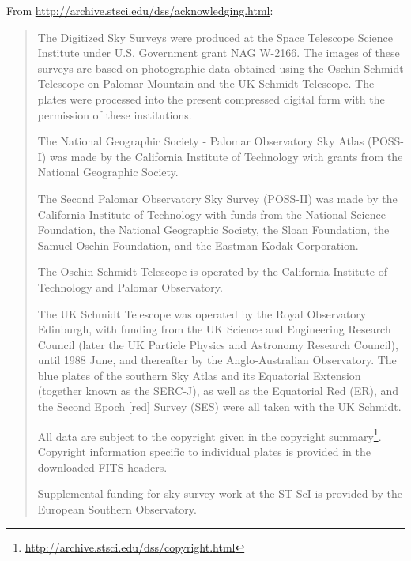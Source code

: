 From \url{http://archive.stsci.edu/dss/acknowledging.html}: %
\begin{quotation}
\noindent The Digitized Sky Surveys were produced at the Space Telescope Science Institute under U.S. Government grant NAG W-2166. 
The images of these surveys are based on photographic data obtained using the Oschin Schmidt Telescope on Palomar Mountain and the UK Schmidt Telescope. 
The plates were processed into the present compressed digital form with the permission of these institutions.

The National Geographic Society - Palomar Observatory Sky Atlas (POSS-I) was made by the 
California Institute of Technology with grants from the National Geographic Society.

The Second Palomar Observatory Sky Survey (POSS-II) was made by the California Institute of Technology with 
funds from the National Science Foundation, the National Geographic Society, the Sloan Foundation, 
the Samuel Oschin Foundation, and the Eastman Kodak Corporation.

The Oschin Schmidt Telescope is operated by the California Institute of Technology and Palomar Observatory.

The UK Schmidt Telescope was operated by the Royal Observatory Edinburgh, with funding from the 
UK Science and Engineering Research Council (later the UK Particle Physics and Astronomy Research Council), 
until 1988 June, and thereafter by the Anglo-Australian Observatory. 
The blue plates of the southern Sky Atlas and its Equatorial Extension (together known as the SERC-J), 
as well as the Equatorial Red (ER), and the Second Epoch [red] Survey (SES) were all taken with the UK Schmidt.

All data are subject to the copyright given in the copyright summary\footnote{\url{http://archive.stsci.edu/dss/copyright.html}}. 
Copyright information specific to individual plates is provided in the downloaded FITS headers.

Supplemental funding for sky-survey work at the ST ScI is provided by the European Southern Observatory. 
\end{quotation}
\endgroup %

